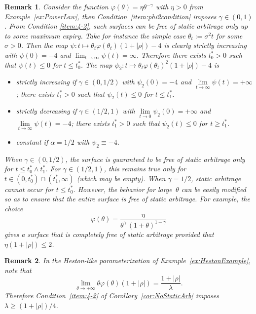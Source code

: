 \documentclass[12pt]{article}
\newtheorem{remark}{Remark}[section]
\numberwithin{equation}{section}
\begin{document}
\begin{remark}\label{rmk:arbFreePowerLaw}
Consider the function $\varphi(\theta)= \eta\theta^{-\gamma}$ with $\eta>0$ from Example~\ref{ex:PowerLaw}, then Condition~\ref{item:phi2condition} imposes $\gamma\in (0,1)$.
From Condition \ref{item:4-2}, such surfaces can be free of static arbitrage only up to some maximum expiry.
Take for instance the simple case $\theta_t:=\sigma^2 t$ for some $\sigma>0$.
Then the map $\psi:t\mapsto \theta_t\varphi(\theta_t)\left(1+|\rho|\right)- 4$ is clearly strictly increasing
with $\psi(0)=-4$ and $\lim_{t\to\infty}\psi(t)=\infty$.
Therefore there exists $t^*_0>0$ such that $\psi(t)\leq 0$ for $t\leq t^*_0$.
The map $\psi_2:t\mapsto \theta_t\varphi(\theta_t)^2\left(1+|\rho|\right)- 4$ is
\begin{itemize}
\item strictly increasing if $\gamma\in (0,1/2)$ with $\psi_2(0)=-4$ and $\lim\limits_{t\to\infty}\psi(t)=+\infty$;
there exists $t^*_1>0$ such that $\psi_2(t)\leq 0$ for $t\leq t^*_1$.
\item strictly decreasing if $\gamma\in (1/2, 1)$ with $\lim\limits_{t\to 0}\psi_2(0)=+\infty$ and $\lim\limits_{t\to\infty}\psi(t)=-4$;
there exists $t^*_1>0$ such that $\psi_2(t)\leq 0$ for $t\geq t^*_1$.
\item constant if $\alpha=1/2$ with $\psi_2\equiv-4$.
\end{itemize}
When $\gamma\in (0,1/2)$, the surface is guaranteed to be free of static arbitrage only for $t\leq t^*_0\wedge t^*_1$.
For $\gamma\in (1/2,1)$, this remains true only for $t\in (0,t^*_0)\cap(t^*_1,\infty)$ (which may be empty).
When $\gamma=1/2$, static arbitrage cannot occur for $t\leq t^*_0$.
However, the behavior for large~$\theta$ can be easily modified so as to ensure that the entire surface is free of static arbitrage.
For example, the choice
\begin{equation}\label{eq:arbFreePhi}
\varphi(\theta)= \frac{\eta}{\theta^\gamma\,(1+\theta)^{1-\gamma}}
\end{equation}
gives a surface that is completely free of static arbitrage provided that $\eta\left(1+|\rho|\right)\leq 2$.
\end{remark}

\begin{remark}
In the Heston-like parameterization of Example~\ref{ex:HestonExample}, note that
$$
\lim_{\theta\to+\infty}\theta\varphi(\theta)\left(1+|\rho|\right) = \frac{1+|\rho|}{\lambda}.
$$
Therefore Condition~\ref{item:4-2} of Corollary~\ref{cor:NoStaticArb} imposes
$\lambda\geq \left(1+|\rho|\right)/4$.
\end{remark}
\end{document}
